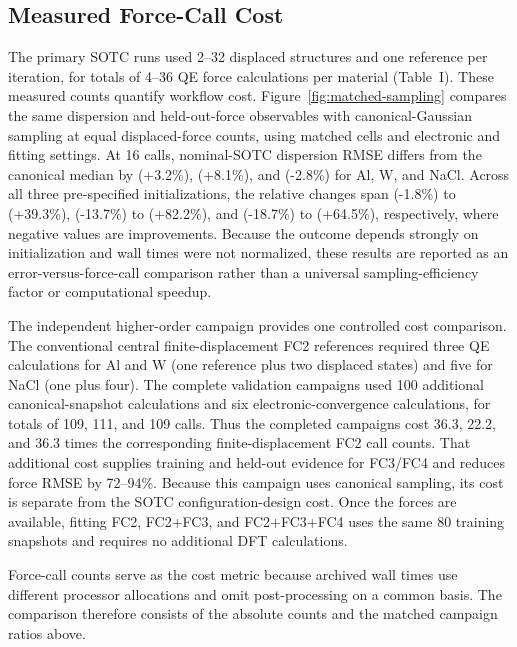 \documentclass[aps,prb,reprint,amsmath,amssymb,floatfix]{revtex4-2}
\begin{document}
\color{revisionblue}
\subsection{Measured Force-Call Cost}\label{computational-efficiency}
\color{black}

\color{revisionblue}
The primary SOTC runs used 2--32 displaced structures and one reference per
iteration, for totals of 4--36 QE force calculations per material (Table~I).
These measured counts quantify workflow cost. Figure~\ref{fig:matched-sampling}
compares the same dispersion and held-out-force observables with
canonical-Gaussian sampling at equal displaced-force counts, using matched
cells and electronic and fitting settings. At 16 calls, nominal-SOTC dispersion
RMSE differs from the canonical median by (+3.2\%), (+8.1\%), and
(-2.8\%) for Al, W, and NaCl. Across all three pre-specified initializations,
the relative changes span (-1.8\%) to (+39.3\%), (-13.7\%) to
(+82.2\%), and (-18.7\%) to (+64.5\%), respectively, where negative
values are improvements. Because the outcome depends strongly on initialization
and wall times were not normalized, these results are reported as an
error-versus-force-call comparison rather than a universal sampling-efficiency
factor or computational speedup.
\color{black}

\color{revisionblue}
The independent higher-order campaign provides one controlled cost comparison.
The conventional central finite-displacement FC2 references required three QE
calculations for Al and W (one reference plus two displaced states) and five for
NaCl (one plus four). The complete validation campaigns used 100 additional
canonical-snapshot calculations and six electronic-convergence calculations,
for totals of 109, 111, and 109 calls. Thus the completed campaigns cost 36.3,
22.2, and 36.3 times the corresponding finite-displacement FC2 call counts.
That additional cost supplies training and held-out evidence for FC3/FC4 and
reduces force RMSE by 72--94\%. Because this campaign uses canonical sampling,
its cost is separate from the SOTC configuration-design cost. Once
the forces are available, fitting FC2, FC2+FC3, and FC2+FC3+FC4 uses the same
80 training snapshots and requires no additional DFT calculations.
\color{black}

\color{revisionblue}
Force-call counts serve as the cost metric because archived wall times use
different processor allocations and omit post-processing on a common basis.
The comparison therefore consists of the absolute counts and the matched
campaign ratios above.
\color{black}
\end{document}
